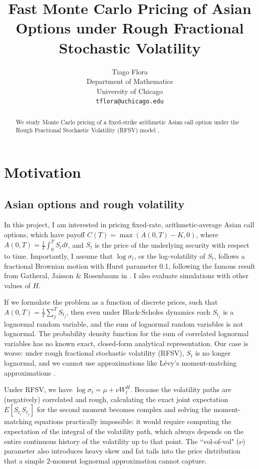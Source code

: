 \documentclass{article}
\title{Fast Monte Carlo Pricing of Asian Options under Rough Fractional Stochastic Volatility}
\author{%
  Tiago Flora \\
  Department of Mathematics\\
  University of Chicago \\
  \texttt{tflora@uchicago.edu} \\
}
\begin{document}
\maketitle

  \begin{abstract}  We study Monte Carlo pricing of a fixed-strike arithmetic Asian call option under the
  Rough Fractional Stochastic Volatility (RFSV) model \citep{gatheral2018volatility},
  \end{abstract}


  \section{Motivation}

  \subsection{Asian options and rough volatility}
  In this project, I am interested in pricing fixed-rate, arithmetic-average Asian call options, which have payoff $C(T) = \max (A(0,T)-K,0)$, where $A(0,T) = \frac 1 T \int^T_0 S_tdt$, and $S_t$ is the price of the underlying security with respect to time. Importantly, I assume that $\log \sigma_t$, or the log-volatility of $S_t$, follows a fractional Brownian motion with Hurst parameter 0.1, following the famous result from Gatheral, Jaisson \& Rosenbaum in \cite{gatheral2018volatility}. I also evaluate simulations with other values of $H$.

  If we formulate the problem as a function of discrete prices, such that $A(0,T) = \frac 1 T \sum^T_j S_{t_j}$, then even under Black-Scholes dynamics each $S_{t_j}$ is a lognormal random variable, and the sum of lognormal random variables is not lognormal. The probability density function for the sum of correlated lognormal variables has no known exact, closed-form analytical representation. Our case is worse: under rough fractional stochastic volatility (RFSV), $S_t$ is no longer lognormal, and we cannot use approximations like L\'{e}vy's moment-matching approximations \cite{levy1992pricing}.

 Under RFSV, we have $\log \sigma_t = \mu + \nu W^H_t$. Because the volatility paths are (negatively) correlated and rough, calculating the exact joint expectation $E[S_{t_i} S_{t_j}]$ for the second moment becomes complex and solving the moment-matching equations practically impossible: it would require computing the expectation of the integral of the volatility path, which always depends on the entire continuous history of the volatility up to that point. The ``vol-of-vol" ($\nu$) parameter also introduces heavy skew and fat tails into the price distribution that a simple 2-moment lognormal approximation cannot capture.
\end{document}
